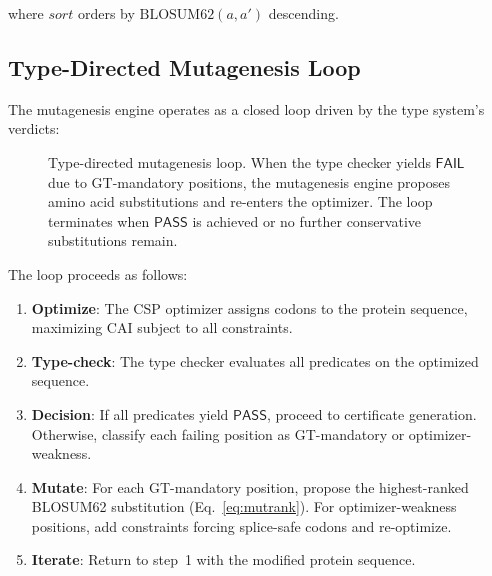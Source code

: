 \documentclass[runningheads]{llncs}
\newcommand{\PASS}{\ensuremath{\mathsf{PASS}}\xspace}
\newcommand{\FAIL}{\ensuremath{\mathsf{FAIL}}\xspace}
\begin{document}
where $\mathit{sort}$ orders by $\text{BLOSUM62}(a, a')$ descending.

\subsection{Type-Directed Mutagenesis Loop}

The mutagenesis engine operates as a closed loop driven by the type system's verdicts:

\begin{figure}[t]
\centering
{}
\caption{Type-directed mutagenesis loop. When the type checker yields \FAIL{} due to GT-mandatory positions, the mutagenesis engine proposes amino acid substitutions and re-enters the optimizer. The loop terminates when \PASS{} is achieved or no further conservative substitutions remain.}
\label{fig:mutloop}
\end{figure}

The loop proceeds as follows:
\begin{enumerate}[leftmargin=*,itemsep=0pt,topsep=1pt]
\item \textbf{Optimize}: The CSP optimizer assigns codons to the protein sequence, maximizing CAI subject to all constraints.
\item \textbf{Type-check}: The type checker evaluates all predicates on the optimized sequence.
\item \textbf{Decision}: If all predicates yield \PASS, proceed to certificate generation. Otherwise, classify each failing position as GT-mandatory or optimizer-weakness.
\item \textbf{Mutate}: For each GT-mandatory position, propose the highest-ranked BLOSUM62 substitution (Eq.~\ref{eq:mutrank}). For optimizer-weakness positions, add constraints forcing splice-safe codons and re-optimize.
\item \textbf{Iterate}: Return to step~1 with the modified protein sequence.
\end{enumerate}
\end{document}
